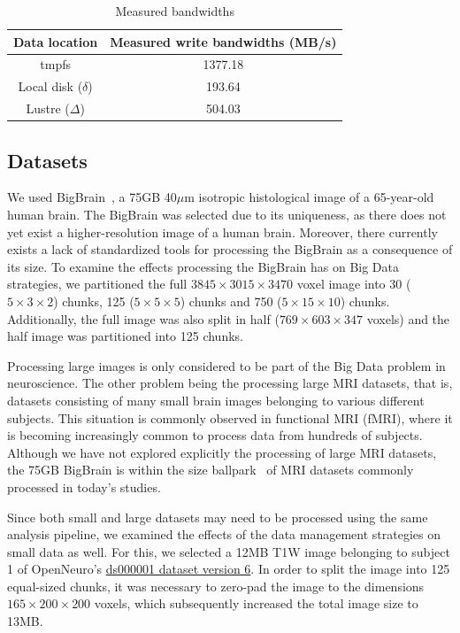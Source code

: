 \begin{table}
\centering
\begin{tabular}{c|c}
\rowcolor{headcolor}
Data location & Measured write bandwidths (MB/s)\\
\hline
tmpfs                 & 1377.18 \\
Local disk ($\delta$) & 193.64  \\
Lustre   ($\Delta$)   & 504.03 \\
\end{tabular}
\setlength{\belowcaptionskip}{-10pt}
\caption{Measured bandwidths}
\label{table:inmem:bdwdths}
\end{table}

\subsection{Datasets} %

We used BigBrain~\cite{amunts2013bigbrain}, a 75GB 40$\mu$m isotropic
histological image of a 65-year-old human brain. The BigBrain was selected due
to its uniqueness, as there does not yet exist a higher-resolution image of a
human brain. Moreover, there currently exists a lack of standardized tools for
processing the BigBrain as a consequence of its size. To examine the effects
processing the BigBrain has on Big Data strategies, we partitioned the full
$3845\times3015\times3470$ voxel image into 30 ($5\times3\times2$) chunks, 125
($5\times5\times5$) chunks and 750 ($5\times15\times10$) chunks. Additionally,
the full image was also split in half ($769\times603\times347$ voxels) and the
half image was partitioned into 125 chunks.

Processing large images is only considered to be part of the Big Data problem in
neuroscience. The other problem being the processing large MRI datasets, that
is, datasets consisting of many small brain images belonging to various
different subjects. This situation is commonly observed in functional MRI
(fMRI), where it is becoming increasingly common to process data from hundreds
of subjects. Although we have not explored explicitly the processing of large
MRI datasets, the 75GB BigBrain is within the size ballpark~\cite{van2014human}
of MRI datasets commonly processed in today's studies.

Since both small and large datasets may need to be processed using the same
analysis pipeline, we examined the effects of the data management strategies on
small data as well. For this, we selected a 12MB T1W image belonging to subject
1 of OpenNeuro's
\href{https://openneuro.org/datasets/ds000001/versions/00006/file-display/sub-01:anat:sub-01_T1w.nii.gz}{ds000001
dataset version 6}. In order to split the image into 125 equal-sized chunks, it
was necessary to zero-pad the image to the dimensions $165\times200\times200$
voxels, which subsequently increased the total image size to 13MB.

